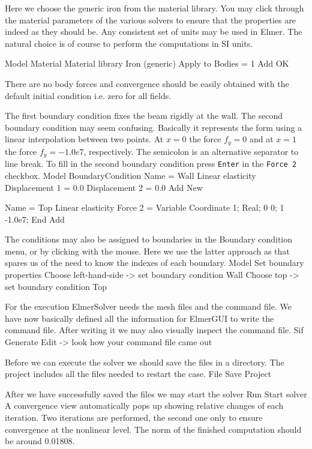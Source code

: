 Here we choose the generic iron from the material library.
You may click through the material parameters of the various solvers to ensure that
the properties are indeed as they should be. Any consistent set of units may be used in Elmer.
The natural choice is of course to perform the computations in SI units. 

\ttbegin
Model
  Material
    Material library    
      Iron (generic)
    Apply to Bodies = 1 
    Add
    OK
\ttend

There are no body forces and convergence should be easily obtained with the default 
initial condition i.e. zero for all fields.

The first boundary condition fixes the beam rigidly at the wall.
The second boundary condition may seem confusing. Basically it represents the form 
using a linear interpolation between two points. At $x=0$ the force $f_y = 0$ and 
at $x=1$ the force $f_y=-1.0e7$, respectively. The semicolon is an alternative separator
to line break. To fill in the second boundary condition press \texttt{Enter} in the 
\texttt{Force 2} checkbox.
\ttbegin
Model
  BoundaryCondition
    Name = Wall
    Linear elasticity
      Displacement 1 = 0.0
      Displacement 2 = 0.0
    Add
    New

    Name = Top
    Linear elasticity 
      Force 2 = Variable Coordinate 1; Real; 0 0; 1 -1.0e7; End
    Add 
\ttend   

The conditions may also be assigned to boundaries in the Boundary condition menu, or 
by clicking with the mouse. Here we use the latter approach as that spares us of the 
need to know the indexes of each boundary.
\ttbegin
Model
  Set boundary properties
    Choose left-hand-side -> set boundary condition Wall
    Choose top -> set boundary condition Top
\ttend

For the execution 
ElmerSolver needs the mesh files and the command file. We have now basically defined
all the information for ElmerGUI to write the command file. After writing it we may also visually 
inspect the command file.
\ttbegin
Sif 
  Generate
  Edit -> look how your command file came out  
\ttend

Before we can execute the solver we should save the files in a directory. The project includes
all the files needed to restart the case.
\ttbegin
File 
  Save Project
\ttend

After we have successfully saved the files we may start the solver
\ttbegin
Run
  Start solver
\ttend
A convergence view automatically pops up showing relative changes of each iteration.
Two iterations are performed, the second one only to ensure convergence at the nonlinear level.
The norm of the finished computation should be around 0.01808.

